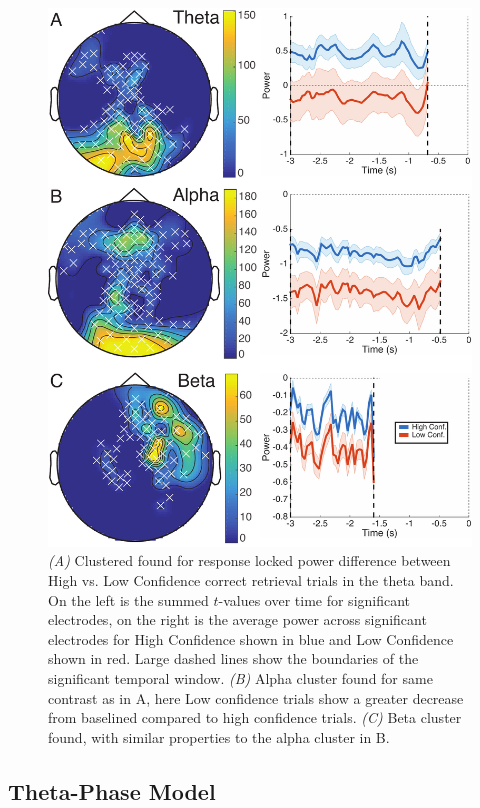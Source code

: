 \documentclass[11pt, titlepage, twoside]{article}
\begin{document}
\begin{figure}
	\begin{center}
		\includegraphics[width=.9\textwidth]{figs/deevConfClusters.pdf}
	\end{center}
	\caption[High vs. Low Confidence EEG Clusters]{
		\emph{(A)} Clustered found for response locked power difference between High vs. Low Confidence correct retrieval trials in the theta band.  On the left is the summed $t$-values over time for significant electrodes, on the right is the average power across significant electrodes for High Confidence shown in blue and Low Confidence shown in red.  Large dashed lines show the boundaries of the significant temporal window.
		\emph{(B)} Alpha cluster found for same contrast  as in A, here Low confidence trials show a greater decrease from baselined compared to high confidence trials.
		\emph{(C)} Beta cluster found, with similar properties to the alpha cluster in B.  
	}
	\label{fig:deevConfClusters}
\end{figure}




\subsection{Theta-Phase Model}
\label{sec:HippModelValidation}
\end{document}
